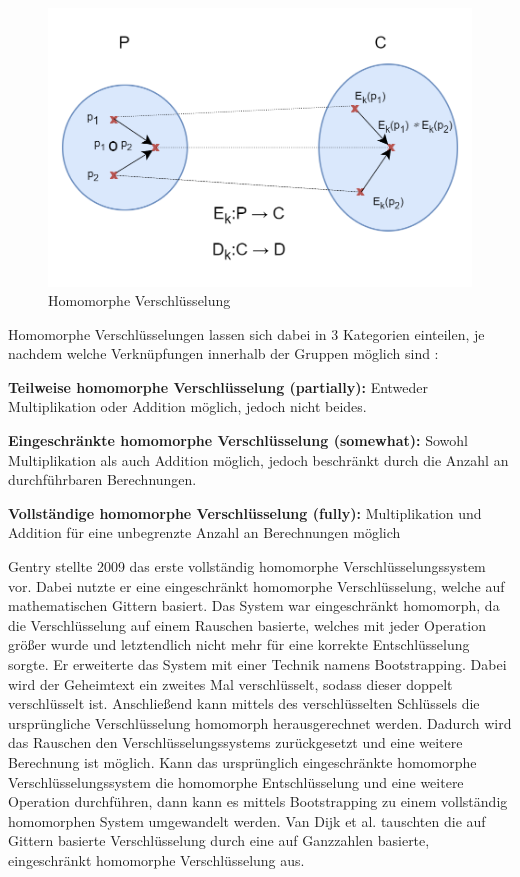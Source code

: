\begin{figure}[!htb]
    \centering
    \includegraphics[width=12cm]{figures/homo_enc.png}
    \caption{Homomorphe Verschlüsselung}
    \label{fig:homo_enc}
\end{figure} 

Homomorphe Verschlüsselungen lassen sich dabei in 3 Kategorien einteilen, je nachdem welche Verknüpfungen innerhalb der Gruppen möglich sind \cite{P-42}:
\begin{compactitem}
\item \textbf{Teilweise homomorphe Verschlüsselung (partially):} Entweder Multiplikation oder Addition möglich, jedoch nicht beides.
\item \textbf{Eingeschränkte homomorphe Verschlüsselung (somewhat):} Sowohl Multiplikation als auch Addition möglich, jedoch beschränkt durch die Anzahl an durchführbaren Berechnungen. 
\item \textbf{Vollständige homomorphe Verschlüsselung (fully):} Multiplikation und Addition für eine unbegrenzte Anzahl an Berechnungen möglich
\end{compactitem}

Gentry \cite{P-40} stellte 2009 das erste vollständig homomorphe Verschlüsselungssystem vor.
Dabei nutzte er eine eingeschränkt homomorphe Verschlüsselung, welche auf mathematischen Gittern basiert.
Das System war eingeschränkt homomorph, da die Verschlüsselung auf einem Rauschen basierte, welches mit jeder Operation größer wurde und letztendlich nicht mehr für eine korrekte Entschlüsselung sorgte.
Er erweiterte das System mit einer Technik namens Bootstrapping.
Dabei wird der Geheimtext ein zweites Mal verschlüsselt, sodass dieser doppelt verschlüsselt ist.
Anschließend kann mittels des verschlüsselten Schlüssels die ursprüngliche Verschlüsselung homomorph herausgerechnet werden. 
Dadurch wird das Rauschen den Verschlüsselungssystems zurückgesetzt und eine weitere Berechnung ist möglich. 
Kann das ursprünglich eingeschränkte homomorphe Verschlüsselungssystem die homomorphe Entschlüsselung und eine weitere Operation durchführen, dann kann es mittels Bootstrapping zu einem vollständig homomorphen System umgewandelt werden.
Van Dijk et al. \cite{P-100} tauschten die auf Gittern basierte Verschlüsselung durch eine auf Ganzzahlen basierte, eingeschränkt homomorphe Verschlüsselung aus.



